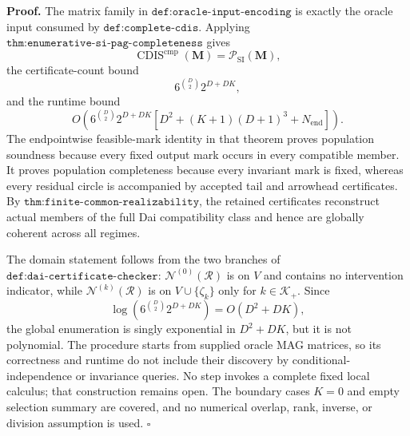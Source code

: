 \textbf{Proof.}
The matrix family in \(\texttt{def:oracle-input-encoding}\) is exactly the oracle input consumed by \(\texttt{def:complete-cdis}\).  Applying \(\texttt{thm:enumerative-si-pag-completeness}\) gives
\[
\operatorname{CDIS}^{\mathrm{cmp}}(\mathbf M)
=\mathcal P_{\mathrm{SI}}(\mathbf M),
\]
the certificate-count bound
\[
6^{\binom D2}2^{D+DK},
\]
and the runtime bound
\[
O\!\left(
6^{\binom D2}2^{D+DK}
\left[D^2+(K+1)(D+1)^3+N_{\mathrm{end}}\right]
\right).
\]
The endpointwise feasible-mark identity in that theorem proves population soundness because every fixed output mark occurs in every compatible member.  It proves population completeness because every invariant mark is fixed, whereas every residual circle is accompanied by accepted tail and arrowhead certificates.  By \(\texttt{thm:finite-common-realizability}\), the retained certificates reconstruct actual members of the full Dai compatibility class and hence are globally coherent across all regimes.

The domain statement follows from the two branches of \(\texttt{def:dai-certificate-checker}\): \(\mathcal N^{(0)}(\mathcal R)\) is on \(V\) and contains no intervention indicator, while \(\mathcal N^{(k)}(\mathcal R)\) is on \(V\cup\{\zeta_k\}\) only for \(k\in\mathcal K_+\).  Since
\[
\log\!\left(6^{\binom D2}2^{D+DK}\right)=O(D^2+DK),
\]
the global enumeration is singly exponential in \(D^2+DK\), but it is not polynomial.  The procedure starts from supplied oracle MAG matrices, so its correctness and runtime do not include their discovery by conditional-independence or invariance queries.  No step invokes a complete fixed local calculus; that construction remains open.  The boundary cases \(K=0\) and empty selection summary are covered, and no numerical overlap, rank, inverse, or division assumption is used. \(\square\)